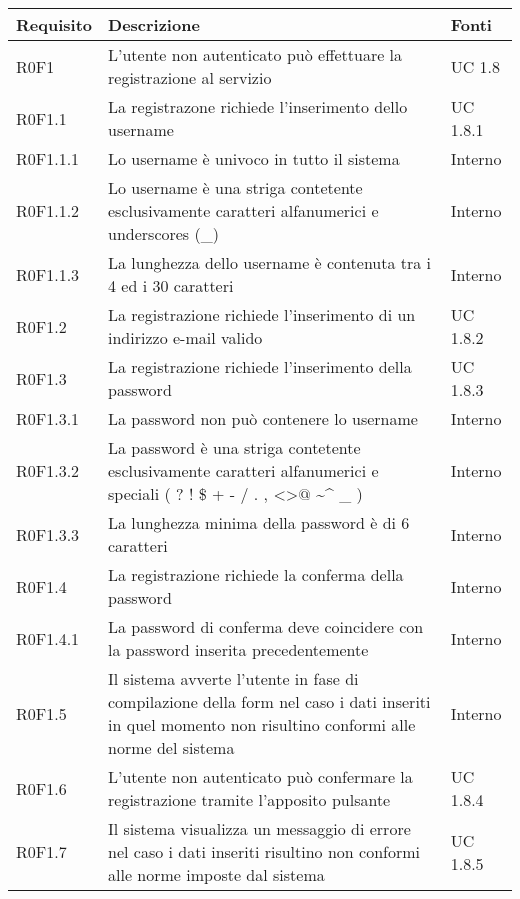 \begin{center}

	\def\arraystretch{1.5}
	\bgroup
	\begin{longtable}{| p{2cm} | p{7cm} | p{2cm} |}

		\hline
		\textbf{Requisito} & \textbf{Descrizione} & \textbf{Fonti} \\
		\hline

		R0F1  &  L'utente non autenticato può effettuare la registrazione al servizio  & UC 1.8 \\
		\hline
		R0F1.1  &  La registrazone richiede l'inserimento dello username  & UC 1.8.1 \\
		\hline
		R0F1.1.1  &  Lo username è univoco in tutto il sistema  &  Interno \\
		\hline
		R0F1.1.2  &  Lo username è una striga contetente esclusivamente caratteri alfanumerici e underscores (\_)  &  Interno \\
		\hline
		R0F1.1.3  &  La lunghezza dello username è contenuta tra i 4 ed i 30 caratteri &  Interno \\
		\hline
		R0F1.2  &  La registrazione richiede l'inserimento di un indirizzo e-mail valido & UC 1.8.2 \\
		\hline
		R0F1.3  &  La registrazione richiede l'inserimento della password  & UC 1.8.3 \\
		\hline
		R0F1.3.1  &  La password non può contenere lo username  &  Interno \\
		\hline
		R0F1.3.2  &  La password è una striga contetente esclusivamente caratteri alfanumerici e speciali ( ? ! \$ + - / . , \textless \textgreater $@$ \textasciitilde \^{} \_ )  & Interno \\
		\hline
		R0F1.3.3  &  La lunghezza minima della password è di 6 caratteri  &  Interno \\
		\hline
		R0F1.4  &  La registrazione richiede la conferma della password & Interno \\
		\hline
		R0F1.4.1  &  La password di conferma deve coincidere con la password inserita precedentemente  &  Interno \\
		\hline
		R0F1.5  &  Il sistema avverte l'utente in fase di compilazione della form nel caso i dati inseriti in quel momento non risultino conformi alle norme del sistema  &  Interno \\
		\hline
		R0F1.6  &  L'utente non autenticato può confermare la registrazione tramite l'apposito pulsante & UC 1.8.4 \\
		\hline
		R0F1.7  &  Il sistema visualizza un messaggio di errore nel caso i dati inseriti risultino non conformi alle norme imposte dal sistema  &  UC 1.8.5 \\

\end{longtable}
\end{center}
